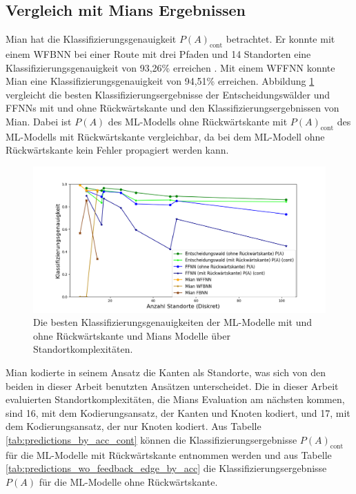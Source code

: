 \subsection{Vergleich mit Mians Ergebnissen}
Mian hat die Klassifizierungsgenauigkeit $P(A)_{\text{cont}}$ betrachtet.
Er konnte mit einem WFBNN bei einer Route mit drei Pfaden und 14 Standorten eine Klassifizierungsgenauigkeit von 93,26\% erreichen \cite{naveedThesis}.
Mit einem WFFNN konnte Mian eine Klassifizierungsgenauigkeit von 94,51\% erreichen.
Abbildung \ref{fig:best_dt_vs_knn_fb_vs_no_fb} vergleicht die besten Klassifizierungsergebnisse der Entscheidungswälder und FFNNs
mit und ohne Rückwärtskante und den Klassifizierungsergebnissen von Mian.
Dabei ist $P(A)$ des ML-Modells ohne Rückwärtskante mit $P(A)_{\text{cont}}$ des ML-Modells mit Rückwärtskante vergleichbar,
da bei dem ML-Modell ohne Rückwärtskante kein Fehler propagiert werden kann.
\begin{figure}[h!]
    \centering
    \includegraphics[width=\linewidth]{images/best_dt_vs_knn_fb_vs_no_fb.png}
    \caption{Die besten Klassifizierungsgenauigkeiten der ML-Modelle mit und ohne Rückwärtskante und Mians Modelle über Standortkomplexitäten.}
    \label{fig:best_dt_vs_knn_fb_vs_no_fb}
\end{figure}
\newline
\newline
Mian kodierte in seinem Ansatz die Kanten als Standorte, was sich von den beiden in dieser Arbeit benutzten Ansätzen unterscheidet.
Die in dieser Arbeit evaluierten Standortkomplexitäten, die Mians Evaluation am nächsten kommen, sind 16, mit dem Kodierungsansatz, der Kanten und Knoten kodiert,
und 17, mit dem Kodierungsansatz, der nur Knoten kodiert.
\newpage
Aus Tabelle \ref{tab:predictions_by_acc_cont} können die Klassifizierungsergebnisse $P(A)_{\text{cont}}$ für die ML-Modelle mit Rückwärtskante entnommen werden
und aus Tabelle \ref{tab:predictions_wo_feedback_edge_by_acc} die Klassifizierungsergebnisse $P(A)$ für die ML-Modelle ohne Rückwärtskante.

